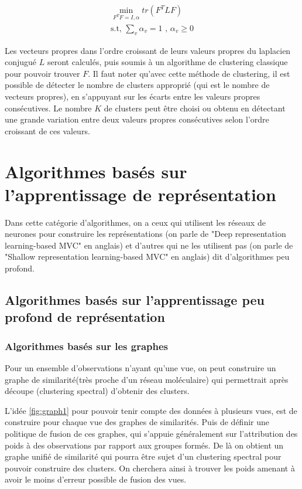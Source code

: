 \documentclass[12pt, french, latin.medieval, a4paper]{report}
\begin{document}
            \begin{equation}
                \begin{aligned}
                    \min_{F^{T}F = I, \alpha} tr(F^{T}LF) \\
                    \text{s.t, } \sum_{v} \alpha_{v} = 1 \text{ , } \alpha_{v} \geq 0
                \end{aligned}
                \label{equa:spectral3}
            \end{equation}
    
            Les vecteurs propres dans l'ordre croissant de leurs valeurs propres du laplacien conjugué $L$ seront calculés, puis soumis à un algorithme de clustering classique pour pouvoir trouver $F$. Il faut noter qu'avec cette méthode de clustering, il est possible de détecter le nombre de clusters approprié (qui est le nombre de vecteurs propres), en s'appuyant sur les écarts entre les valeurs propres consécutives. Le nombre $K$ de clusters peut être choisi ou obtenu en détectant une grande variation entre deux valeurs propres consécutives selon l'ordre croissant de ces valeurs.

	\section{Algorithmes basés sur l'apprentissage de représentation}
    	Dans cette catégorie d'algorithmes, on a ceux qui utilisent les réseaux de neurones pour construire les représentations (on parle de "Deep representation learning-based MVC" en anglais) et d'autres qui ne les utilisent pas (on parle de "Shallow representation learning-based MVC" en anglais) dit d'algorithmes peu profond.

    	\subsection{Algorithmes basés sur l'apprentissage peu profond de représentation }
        	\subsubsection{Algorithmes basés sur les graphes}
        	Pour un ensemble d'observations n'ayant qu'une vue, on peut construire un graphe de similarité(très proche d'un réseau moléculaire) qui permettrait après découpe (clustering spectral) d'obtenir des clusters.
       	 
        	L'idée \ref{fig:graph1} pour pouvoir tenir compte des données à plusieurs vues, est de construire pour chaque vue des graphes de similarités. Puis de définir une politique de fusion de ces graphes, qui s'appuie généralement sur l'attribution des poids à des observations par rapport aux groupes formés. De là on obtient un graphe unifié de similarité qui pourra être sujet d'un clustering spectral pour pouvoir construire des clusters. On cherchera ainsi à trouver les poids amenant à avoir le moins d'erreur possible de fusion des vues.
    
\end{document}
